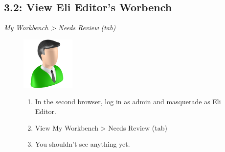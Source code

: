 \documentclass[letterpaper,10pt,english]{sphinxmanual}
\begin{document}
\subsection{3.2: View Eli Editor's Worbench}
\label{workbench:view-eli-editor-s-worbench}
\emph{My Workbench \textgreater{} Needs Review (tab)}
\begin{figure}[htbp]
\centering

\includegraphics{editor.png}
{\small \begin{enumerate}
\item {} 
In the second browser, log in as admin and masquerade as Eli Editor.

\item {} 
View My Workbench \textgreater{} Needs Review (tab)

\item {} 
You shouldn't see anything yet.

\end{enumerate}
}\end{figure}
\end{document}
